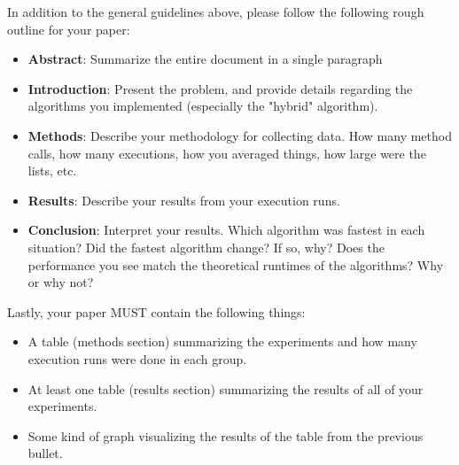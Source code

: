 \documentclass[paper=a4, fontsize=11pt, parskip=full]{scrartcl} %
\numberwithin{equation}{section} %
\numberwithin{figure}{section} %
\numberwithin{table}{section} %
\begin{document}
In addition to the general guidelines above, please follow the following rough outline for your paper:

\begin{itemize}
	\item \textbf{Abstract}: Summarize the entire document in a single paragraph
	\item \textbf{Introduction}: Present the problem, and provide details regarding the algorithms you implemented (especially the "hybrid" algorithm).
	\item \textbf{Methods}: Describe your methodology for collecting data. How many method calls, how many executions, how you averaged things, how large were the lists, etc.
	\item \textbf{Results}: Describe your results from your execution runs.
	\item \textbf{Conclusion}: Interpret your results. Which algorithm was fastest in each situation? Did the fastest algorithm change? If so, why? Does the performance you see match the theoretical runtimes of the algorithms? Why or why not?
\end{itemize}

Lastly, your paper MUST contain the following things:

\begin{itemize}
	\item A table (methods section) summarizing the experiments and how many execution runs were done in each group.
	\item At least one table (results section) summarizing the results of all of your experiments.
	\item Some kind of graph visualizing the results of the table from the previous bullet.
\end{itemize}


\end{document}
